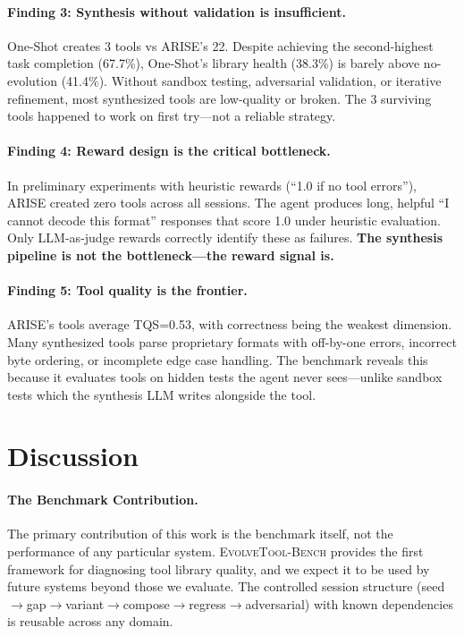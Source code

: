 \documentclass[10pt,twocolumn]{article}
\begin{document}
\paragraph{Finding 3: Synthesis without validation is insufficient.} One-Shot creates 3 tools vs ARISE's 22. Despite achieving the second-highest task completion (67.7\%), One-Shot's library health (38.3\%) is barely above no-evolution (41.4\%). Without sandbox testing, adversarial validation, or iterative refinement, most synthesized tools are low-quality or broken. The 3 surviving tools happened to work on first try---not a reliable strategy.

\paragraph{Finding 4: Reward design is the critical bottleneck.} In preliminary experiments with heuristic rewards (``1.0 if no tool errors''), ARISE created zero tools across all sessions. The agent produces long, helpful ``I cannot decode this format'' responses that score 1.0 under heuristic evaluation. Only LLM-as-judge rewards correctly identify these as failures. \textbf{The synthesis pipeline is not the bottleneck---the reward signal is.}

\paragraph{Finding 5: Tool quality is the frontier.} ARISE's tools average TQS=0.53, with correctness being the weakest dimension. Many synthesized tools parse proprietary formats with off-by-one errors, incorrect byte ordering, or incomplete edge case handling. The benchmark reveals this because it evaluates tools on hidden tests the agent never sees---unlike sandbox tests which the synthesis LLM writes alongside the tool.

\section{Discussion}

\paragraph{The Benchmark Contribution.} The primary contribution of this work is the benchmark itself, not the performance of any particular system. \textsc{EvolveTool-Bench} provides the first framework for diagnosing tool library quality, and we expect it to be used by future systems beyond those we evaluate. The controlled session structure (seed$\to$gap$\to$variant$\to$compose$\to$regress$\to$adversarial) with known dependencies is reusable across any domain.
\end{document}
